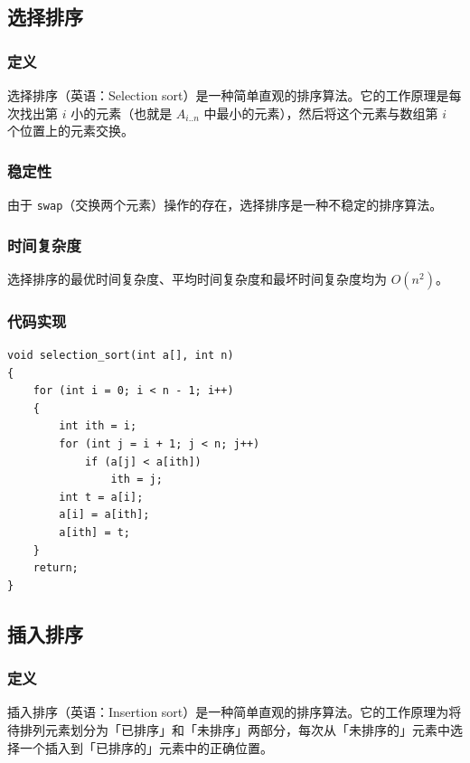 \documentclass[12pt]{article}
\begin{document}
\subsection{选择排序}

\subsubsection{定义}

选择排序（英语：Selection sort）是一种简单直观的排序算法。它的工作原理是每次找出第 $i$ 小的元素（也就是 $A_{i..n}$ 中最小的元素），然后将这个元素与数组第 $i$ 个位置上的元素交换。

\subsubsection{稳定性}

由于 \verb|swap|（交换两个元素）操作的存在，选择排序是一种不稳定的排序算法。

\subsubsection{时间复杂度}

选择排序的最优时间复杂度、平均时间复杂度和最坏时间复杂度均为 $O(n^2)$。

\subsubsection{代码实现}

{\setmainfont{Consolas} %
\begin{lstlisting}
void selection_sort(int a[], int n)
{
    for (int i = 0; i < n - 1; i++)
    {
        int ith = i;
        for (int j = i + 1; j < n; j++)
            if (a[j] < a[ith])
                ith = j;
        int t = a[i];
        a[i] = a[ith];
        a[ith] = t;
    }
    return;
}
\end{lstlisting}
}

\subsection{插入排序}

\subsubsection{定义}

插入排序（英语：Insertion sort）是一种简单直观的排序算法。它的工作原理为将待排列元素划分为「已排序」和「未排序」两部分，每次从「未排序的」元素中选择一个插入到「已排序的」元素中的正确位置。
\end{document}

